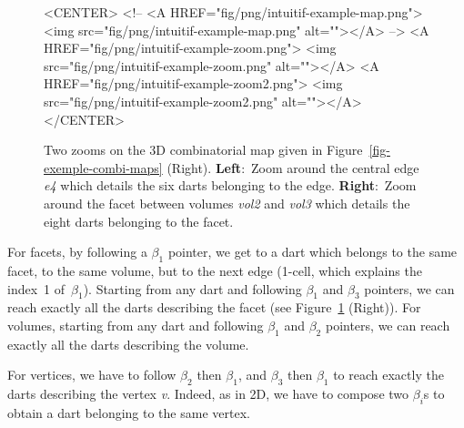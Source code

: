 \begin{figure}
\begin{ccTexOnly}
\begin{center}
    \end{center}
  \end{ccTexOnly}
  \begin{ccHtmlOnly}
    <CENTER>
    <!-- <A HREF="fig/png/intuitif-example-map.png">
    <img src="fig/png/intuitif-example-map.png" alt=""></A> -->
    <A HREF="fig/png/intuitif-example-zoom.png">
        <img src="fig/png/intuitif-example-zoom.png" alt=""></A>
    <A HREF="fig/png/intuitif-example-zoom2.png">
        <img src="fig/png/intuitif-example-zoom2.png" alt=""></A>
    </CENTER>
    \end{ccHtmlOnly}
    \caption{Two zooms on the 3D combinatorial map given in 
      Figure~\ref{fig-exemple-combi-maps} (Right).
      \textbf{Left}:~Zoom around the central edge \emph{e4} which details
      the six darts belonging to the edge.  \textbf{Right}:~Zoom
      around the facet between volumes \emph{vol2} and \emph{vol3} which
      details the eight darts belonging to the facet.}
    \label{fig-intuitive-exemple}
\end{figure}

For facets, by following a $\beta_1$ pointer, we get to a dart which
belongs to the same facet, to the same volume, but to the next edge
(1-cell, which explains the index~1 of~$\beta_1$).  Starting from any
dart and following $\beta_1$ and $\beta_3$ pointers, we can reach
exactly all the darts describing the facet (see
Figure~\ref{fig-intuitive-exemple} (Right)).
%
For volumes, starting from any dart and following $\beta_1$ and
$\beta_2$ pointers, we can reach exactly all the darts describing the
volume.

For vertices, we have to follow $\beta_2$ then $\beta_1$, and
$\beta_3$ then $\beta_1$ to reach exactly the darts describing the
vertex \emph{v}. Indeed, as in 2D, we have to compose two $\beta_i$s to
obtain a dart belonging to the same vertex.

